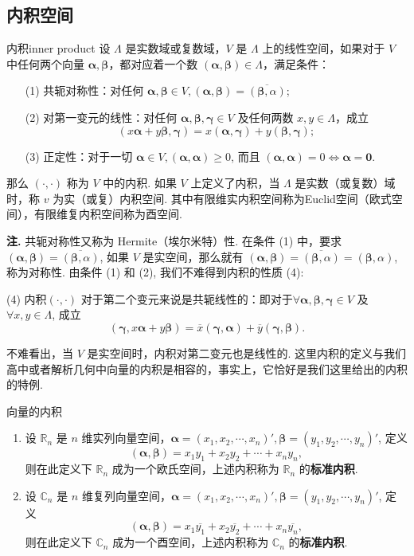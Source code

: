\documentclass[12pt, a4paper,newtx]{ctexart}
\newenvironment{remark}{\dbend\textbf{注. }}{}{}
\begin{document}
\subsection{内积空间}
\begin{definition}{内积}{inner product} \kaishu 
	设 $\Lambda$ 是实数域或复数域，$V$ 是 $\Lambda$ 上的线性空间，如果对于 $V$ 中任何两个向量 $\bm\alpha,\bm\beta$，都对应着一个数 $(\bm\alpha, \bm\beta) \in \Lambda$，满足条件：
	\begin{enumerate}
		\item[(1)] 共轭对称性：对任何 $\bm\alpha, \bm\beta \in V, (\bm\alpha, \bm\beta) = \overline{(\bm\beta, \alpha)}$;
		\item[(2)] 对第一变元的线性：对任何 $\bm\alpha, \bm\beta, \bm\gamma \in V$ 及任何两数 $x,y \in \Lambda$，成立
		\[
		(x\bm\alpha + y\bm\beta, \bm\gamma) = x (\bm\alpha, \bm\gamma) + y (\bm\beta, \bm\gamma);
		\]
		\item[(3)] 正定性：对于一切 $\bm\alpha \in V, (\bm\alpha, \bm\alpha) \geqslant 0$, 而且 $(\bm\alpha, \bm\alpha) = 0\iff \bm\alpha = \bm 0$.
	\end{enumerate}
	那么 $(·,·)$ 称为 $V$ 中的{\heiti 内积}. 如果 $V$ 上定义了内积，当 $\Lambda$ 是实数（或复数）域时，称 $v$ 为实（或复）{\heiti 内积空间}. 其中有限维实内积空间称为{\heiti Euclid空间（欧式空间）}，有限维复内积空间称为{\heiti 酉空间}. 
\end{definition}
\begin{remark}
	共轭对称性又称为 Hermite（埃尔米特）性. 在条件 (1) 中，要求 $(\bm\alpha, \bm\beta) = \overline{(\bm\beta, \alpha)}$, 如果 $V$ 是实空间，那么就有 $(\bm\alpha, \bm\beta) = \overline{(\bm\beta, \alpha)}=(\bm\beta, \alpha)$, 称为对称性. 
	由条件 (1) 和 (2), 我们不难得到内积的性质 (4): 
	\begin{tcolorbox}
		(4) 内积$(·,·)$ 对于第二个变元来说是共轭线性的：即对于$\forall\bm\alpha, \bm\beta, \bm\gamma \in V$ 及 $\forall x, y\in\Lambda$, 成立
		\[(\bm\gamma, x\bm\alpha + y\bm\beta) = \overline{x}(\bm\gamma, \bm\alpha) + \overline{y}(\bm\gamma, \bm\beta).
		\]
	\end{tcolorbox}
	不难看出，当 $V$ 是实空间时，内积对第二变元也是线性的. 
\end{remark}
	这里内积的定义与我们高中或者解析几何中向量的内积是相容的，事实上，它恰好是我们这里给出的内积的特例. 
	\begin{example}{向量的内积}{}
		\begin{enumerate}
			\item 设 $\mathbb{R}_n$ 是 $n$ 维实列向量空间，$\bm\alpha = (x_1, x_2, \cdots, x_n)', \bm\beta = (y_1, y_2, \cdots, y_n)'$, 定义
			\[
			(\bm\alpha, \bm\beta) = x_1 y_1 + x_2 y_2 + \cdots + x_n y_n,
			\]
			则在此定义下 $\mathbb{R}_n$ 成为一个欧氏空间，上述内积称为 $\mathbb{R}_n$ 的\textbf{标准内积}.
			\item 设 $\mathbb{C}_n$ 是 $n$ 维复列向量空间，$\bm\alpha = (x_1, x_2, \cdots, x_n)', \bm\beta = (y_1, y_2, \cdots, y_n)'$, 定义
			\[
			(\bm\alpha, \bm\beta) = x_1 \overline{y_1} + x_2 \overline{y_2} + \cdots + x_n\overline{y_n},
			\]
			则在此定义下 $\mathbb{C}_n$ 成为一个酉空间，上述内积称为 $\mathbb{C}_n$ 的\textbf{标准内积}.
		\end{enumerate}
	\end{example}
\end{document}
